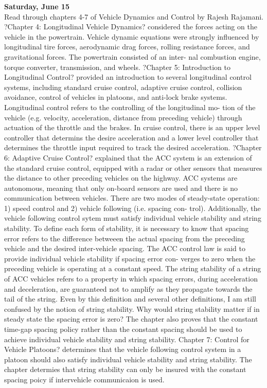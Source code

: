 \documentclass[12pt, letterpaper]{article}
\begin{document}
{\bf Saturday, June 15} \\
Read through chapters 4-7 of Vehicle Dynamics and Control by Rajesh Rajamani. ?Chapter 4: Longitudinal Vehicle Dynamics? considered the forces acting on the vehicle in the powertrain. Vehicle dynamic equations were strongly influenced by longitudinal tire forces, aerodynamic drag forces, rolling resistance forces, and gravitational forces. The powertrain consisted of an inter- nal combustion engine, torque converter, transmission, and wheels. ?Chapter 5: Introduction to Longitudinal Control? provided an introduction to several longitudinal control systems, including standard cruise control, adaptive cruise control, collision avoidance, control of vehicles in platoons, and anti-lock brake systems. Longitudinal control refers to the controlling of the longitudinal mo- tion of the vehicle (e.g. velocity, acceleration, distance from preceding vehicle) through actuation of the throttle and the brakes. In cruise control, there is an upper level controller that determins the desire acceleration and a lower level controller that determines the throttle input required to track the desired acceleration. ?Chapter 6: Adaptive Cruise Control? explained that the ACC system is an extension of the standard cruise control, equipped with a radar or other sensors that measures the distance to other preceding vehicles on the highway. ACC systems are autonomous, meaning that only on-board sensors are used and there is no communication between vehicles. There are two modes of steady-state operation: 1) speed control and 2) vehicle following (i.e. spacing con- trol). Additionally, the vehicle following control sytem must satisfy individual vehicle stability and string stability. To define each form of stability, it is necessary to know that spacing error refers to the difference betweeen the actual spacing from the preceding vehicle and the desired inter-vehicle spacing. The ACC control law is said to provide individual vehicle stability if spacing error con- verges to zero when the preceding vehicle is operating at a constant speed. The string stability of a string of ACC vehicles refers to a property in which spacing errors, during acceleration and deceleration, are guaranteed not to amplify as they propagate towards the tail of the string. Even by this definition and several other definitions, I am still confused by the notion of string stability. Why would string stability matter if in steady state the spacing error is zero? The chapter also proves that the constant time-gap spacing policy rather than the constant spacing should be used to achieve individual vehicle stability and string stability. Chapter 7: Control for Vehicle Platoons? determines that the vehicle following control system in a platoon should also satisfy individual vehicle stability and string stability. The chapter determies that string stability can only be insured with the constant spacing poicy if intervehicle communicaion is used. \\
\end{document}
